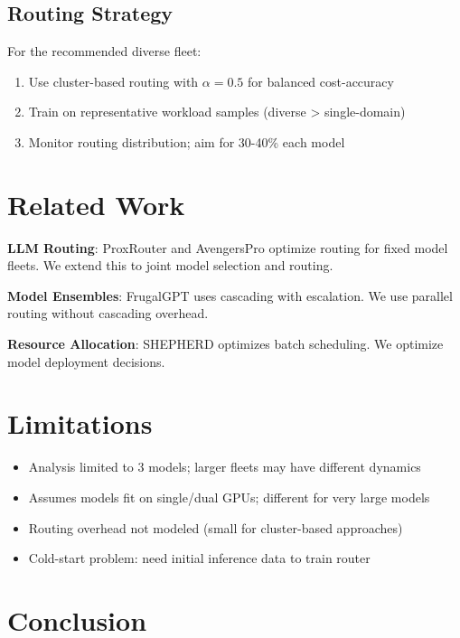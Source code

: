 \documentclass[11pt,a4paper]{article}
\begin{document}
\subsection{Routing Strategy}

For the recommended diverse fleet:
\begin{enumerate}
    \item Use cluster-based routing with $\alpha = 0.5$ for balanced cost-accuracy
    \item Train on representative workload samples (diverse > single-domain)
    \item Monitor routing distribution; aim for 30-40\% each model
\end{enumerate}

\section{Related Work}

\textbf{LLM Routing}: ProxRouter \citep{proxrouter2024} and AvengersPro \citep{avengerspro2024} optimize routing for fixed model fleets. We extend this to joint model selection and routing.

\textbf{Model Ensembles}: FrugalGPT \citep{chen2023frugalgpt} uses cascading with escalation. We use parallel routing without cascading overhead.

\textbf{Resource Allocation}: SHEPHERD \citep{shepherd2024} optimizes batch scheduling. We optimize model deployment decisions.

\section{Limitations}

\begin{itemize}
    \item Analysis limited to 3 models; larger fleets may have different dynamics
    \item Assumes models fit on single/dual GPUs; different for very large models
    \item Routing overhead not modeled (small for cluster-based approaches)
    \item Cold-start problem: need initial inference data to train router
\end{itemize}

\section{Conclusion}
\end{document}
